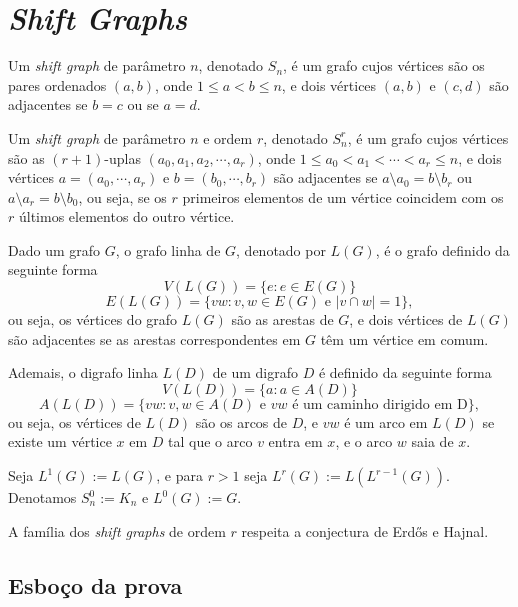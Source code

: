 \chapter{\textit{Shift Graphs}}
\label{cap:shift}

\begin{definicao}
Um \textit{shift graph} de parâmetro $n$, denotado $S_n$, é um grafo cujos vértices são os pares ordenados $(a,b)$, onde $1 \leq a < b \leq n$, e dois vértices $(a,b)$ e $(c,d)$ são adjacentes se $b = c$ ou se $a = d$.
\end{definicao}

\begin{definicao}
Um \textit{shift graph} de parâmetro $n$ e ordem $r$, denotado $S_n^r$, é um grafo cujos vértices são as $(r+1)$-uplas $(a_0, a_1, a_2, \cdots, a_r)$, onde $1 \leq a_0 < a_1 < \cdots < a_r \leq n$, e dois vértices $a = (a_0, \cdots, a_r)$ e $b = (b_0, \cdots, b_r)$ são adjacentes se $a\setminus a_0 = b\setminus b_r$ ou $a\setminus a_r = b\setminus b_0$, ou seja, se os $r$ primeiros elementos de um vértice coincidem com os $r$ últimos elementos do outro vértice.
\end{definicao}

\begin{definicao}
Dado um grafo $G$, o grafo linha de $G$, denotado por $L(G)$, é o grafo definido da seguinte forma
\[V(L(G)) = \{e : e \in E(G)\}\]
\[E(L(G)) = \{vw : v,w \in E(G) \text{ e } |v \cap w| = 1\},\]
ou seja, os vértices do grafo $L(G)$ são as arestas de $G$, e dois vértices de $L(G)$ são adjacentes se as arestas correspondentes em $G$ têm um vértice em comum.

Ademais, o digrafo linha $L(D)$ de um digrafo $D$ é definido da seguinte forma
\[V(L(D)) = \{a : a \in A(D)\}\]
\[A(L(D)) = \{vw : v,w \in A(D) \text{ e } vw \text{ é um caminho dirigido em D}\},\]
ou seja, os vértices de $L(D)$ são os arcos de $D$, e $vw$ é um arco em $L(D)$ se existe um vértice $x$ em $D$ tal que o arco $v$ entra em $x$, e o arco $w$ saia de $x$.
\end{definicao}

Seja $L^1(G) := L(G)$, e para $r>1$ seja $L^r(G) := L(L^{r-1}(G))$. Denotamos $S_n^0 := K_n$ e $L^0(G) := G$. 

\begin{teorema}\label{shiftteo}
A família dos \textit{shift graphs} de ordem $r$ respeita a conjectura de Erd\H{o}s e Hajnal.
\end{teorema}

\section{Esboço da prova}

